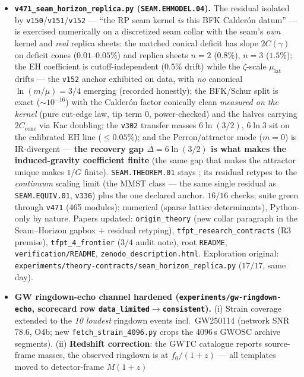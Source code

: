 \begin{itemize}[leftmargin=1.5em]
\item \textbf{\texttt{v471\_seam\_horizon\_replica.py} (\texttt{SEAM.EHMODEL.04}).} The residual isolated by
\texttt{v150}/\texttt{v151}/\texttt{v152} --- ``the RP seam kernel \emph{is} this BFK Calder\'on datum'' ---
is exercised numerically on a discretized seam collar with the seam's \emph{own} kernel and \emph{real}
replica sheets: the matched conical deficit has slope $2C(\gamma)$ on deficit cones ($0.01$--$0.05\%$) and
replica sheets $n{=}2$ ($0.8\%$), $n{=}3$ ($1.5\%$); the EH coefficient is cutoff-independent ($0.5\%$
drift) while the $\zeta$-scale $\mu_{\mathrm{lat}}$ drifts --- the \texttt{v152} anchor exhibited on data,
with \emph{no} canonical $\ln(m/\mu){=}3/4$ emerging (recorded honestly); the BFK/Schur split is exact
(${\sim}10^{-16}$) with the Calder\'on factor conically clean \emph{measured on the kernel} (pure cut-edge
law, tip term $0$, power-checked) and the halves carrying $2C_{\mathrm{cone}}$ via Kac doubling; the
\texttt{v302} transfer masses $6\ln(3/2)$, $6\ln 3$ sit on the calibrated EH line ($\le0.05\%$); and the
Perron/attractor mode ($m{=}0$) is IR-divergent --- \textbf{the recovery gap $\Delta{=}6\ln(3/2)$ is what
makes the induced-gravity coefficient finite} (the same gap that makes the attractor unique makes $1/G$
finite). \texttt{SEAM.THEOREM.01} stays \mO; its residual retypes to the \emph{continuum} scaling limit
(the MMST class --- the same single residual as \texttt{SEAM.EQUIV.01}, \texttt{v336}) plus the one declared
anchor. $16/16$ checks; suite green through \texttt{v471} (465 modules); numerical (sparse lattice
determinants), Python-only by nature. Papers updated: \texttt{origin\_theory} (new collar paragraph in the
Seam--Horizon gapbox $+$ residual retyping), \texttt{tfpt\_research\_contracts} (R3 premise),
\texttt{tfpt\_4\_frontier} ($3/4$ audit note), root \texttt{README}, \texttt{verification/README},
\texttt{zenodo\_description.html}. Exploration original:
\texttt{experiments/theory-contracts/seam\_horizon\_replica.py} ($17/17$, same day).
\item \textbf{GW ringdown-echo channel hardened (\texttt{experiments/gw-ringdown-echo}, scorecard row
\texttt{data\_limited}${\to}$\texttt{consistent}).} (i) Strain coverage extended to the \emph{10 loudest}
ringdown events incl.\ GW250114 (network SNR $78.6$, O4b; new \texttt{fetch\_strain\_4096.py} crops the
4096\,s GWOSC archive segments). (ii) \textbf{Redshift correction}: the GWTC catalogue reports source-frame
masses, the observed ringdown is at $f_0/(1{+}z)$ --- all templates moved to detector-frame $M(1{+}z)$

\end{itemize}
